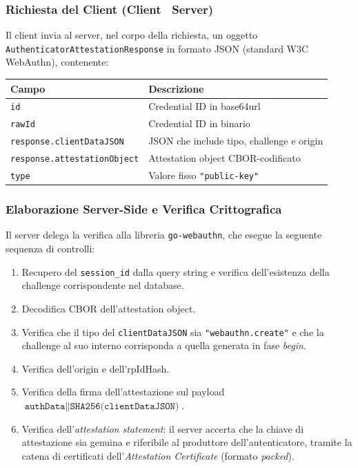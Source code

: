 \subsubsection*{Richiesta del Client (Client \textrightarrow\ Server)}

Il client invia al server, nel corpo della richiesta, un oggetto
\texttt{AuthenticatorAttestationResponse} in formato JSON (standard W3C
WebAuthn), contenente:

\begin{center}
\begin{tabular}{@{}lp{9cm}@{}}
\toprule
\textbf{Campo} & \textbf{Descrizione} \\
\midrule
\texttt{id}               & Credential ID in base64url \\
\texttt{rawId}            & Credential ID in binario  \\
\texttt{response.clientDataJSON} & JSON che include tipo, challenge e origin \\
\texttt{response.attestationObject} & Attestation object CBOR-codificato \\
\texttt{type}             & Valore fisso \texttt{"public-key"} \\
\bottomrule
\end{tabular}
\end{center}

\subsubsection*{Elaborazione Server-Side e Verifica Crittografica}

Il server delega la verifica alla libreria \texttt{go-webauthn},
che esegue la seguente sequenza di controlli:

\begin{enumerate}
  \item Recupero del \texttt{session\_id} dalla query string e verifica
    dell'esistenza della challenge corrispondente nel database.
  \item Decodifica CBOR dell'attestation object.
  \item Verifica che il tipo del \texttt{clientDataJSON} sia
    \texttt{"webauthn.create"} e che la challenge al suo interno
    corrisponda a quella generata in fase \emph{begin}.
  \item Verifica dell'origin e dell'rpIdHash.
  \item Verifica della firma dell'attestazione sul payload
    $\texttt{authData} \| \texttt{SHA256(clientDataJSON)}$.
  \item Verifica dell'\emph{attestation statement}: il server accerta
    che la chiave di attestazione sia genuina e riferibile al
    produttore dell'autenticatore, tramite la catena di certificati
    dell'\emph{Attestation Certificate} (formato \emph{packed}).
\end{enumerate}

